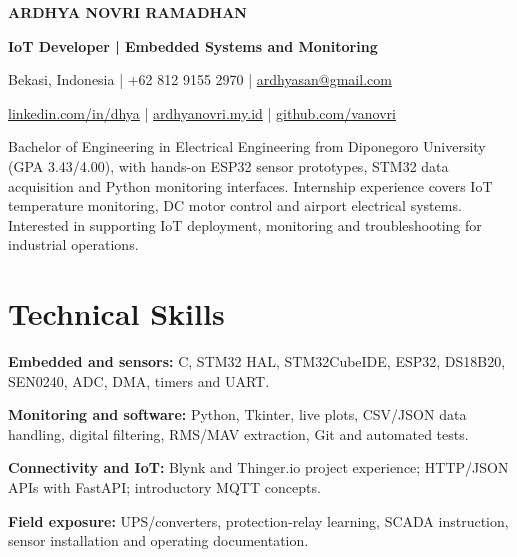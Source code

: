 \documentclass[11pt,a4paper]{article}
\begin{document}
\begin{center}
{\fontsize{20}{23}\selectfont\bfseries ARDHYA NOVRI RAMADHAN}\par
\vspace{3pt}
{\bfseries IoT Developer | Embedded Systems and Monitoring}\par
Bekasi, Indonesia | +62 812 9155 2970 | \href{mailto:ardhyasan@gmail.com}{ardhyasan@gmail.com}\par
\href{https://www.linkedin.com/in/dhya/}{linkedin.com/in/dhya} | \href{https://ardhyanovri.my.id}{ardhyanovri.my.id} | \href{https://github.com/vanovri}{github.com/vanovri}
\end{center}
\raggedright
Bachelor of Engineering in Electrical Engineering from Diponegoro University (GPA 3.43/4.00), with hands-on ESP32 sensor prototypes, STM32 data acquisition and Python monitoring interfaces. Internship experience covers IoT temperature monitoring, DC motor control and airport electrical systems. Interested in supporting IoT deployment, monitoring and troubleshooting for industrial operations.\par
\section{Technical Skills}
\textbf{Embedded and sensors:} C, STM32 HAL, STM32CubeIDE, ESP32, DS18B20, SEN0240, ADC, DMA, timers and UART.\par
\textbf{Monitoring and software:} Python, Tkinter, live plots, CSV/JSON data handling, digital filtering, RMS/MAV extraction, Git and automated tests.\par
\textbf{Connectivity and IoT:} Blynk and Thinger.io project experience; HTTP/JSON APIs with FastAPI; introductory MQTT concepts.\par
\textbf{Field exposure:} UPS/converters, protection-relay learning, SCADA instruction, sensor installation and operating documentation.\par
\end{document}
